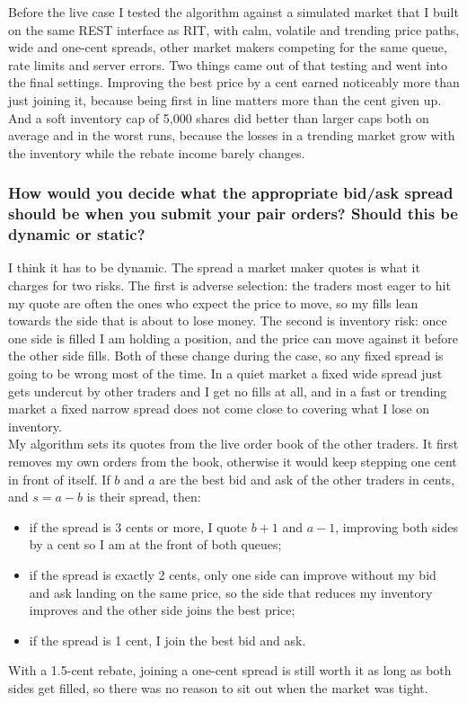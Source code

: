 \documentclass{article}
\begin{document}
\noindent Before the live case I tested the algorithm against a simulated market that I built on the same REST interface as RIT, with calm, volatile and trending price paths, wide and one-cent spreads, other market makers competing for the same queue, rate limits and server errors. Two things came out of that testing and went into the final settings. Improving the best price by a cent earned noticeably more than just joining it, because being first in line matters more than the cent given up. And a soft inventory cap of 5{,}000 shares did better than larger caps both on average and in the worst runs, because the losses in a trending market grow with the inventory while the rebate income barely changes.

\subsubsection{How would you decide what the appropriate bid/ask spread should be when you submit your pair orders? Should this be dynamic or static?}
\label{sec:sb_spread}

I think it has to be dynamic. The spread a market maker quotes is what it charges for two risks. The first is adverse selection: the traders most eager to hit my quote are often the ones who expect the price to move, so my fills lean towards the side that is about to lose money. The second is inventory risk: once one side is filled I am holding a position, and the price can move against it before the other side fills. Both of these change during the case, so any fixed spread is going to be wrong most of the time. In a quiet market a fixed wide spread just gets undercut by other traders and I get no fills at all, and in a fast or trending market a fixed narrow spread does not come close to covering what I lose on inventory.\\

\noindent My algorithm sets its quotes from the live order book of the other traders. It first removes my own orders from the book, otherwise it would keep stepping one cent in front of itself. If $b$ and $a$ are the best bid and ask of the other traders in cents, and $s = a - b$ is their spread, then:
\begin{itemize}
  \item if the spread is 3 cents or more, I quote $b + 1$ and $a - 1$, improving both sides by a cent so I am at the front of both queues;
  \item if the spread is exactly 2 cents, only one side can improve without my bid and ask landing on the same price, so the side that reduces my inventory improves and the other side joins the best price;
  \item if the spread is 1 cent, I join the best bid and ask.
\end{itemize}
With a 1.5-cent rebate, joining a one-cent spread is still worth it as long as both sides get filled, so there was no reason to sit out when the market was tight.\\
\end{document}
